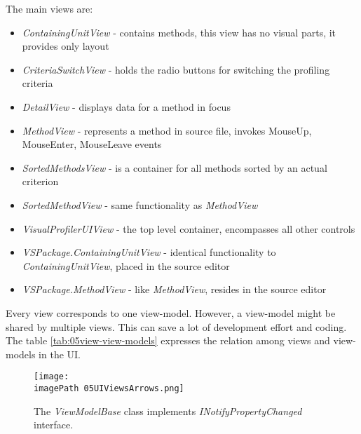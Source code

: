 The main views are:

\begin{itemize}	
\item  \textit{ContainingUnitView} - contains methods, this view has no visual parts, it provides only layout 

\item \textit{CriteriaSwitchView} - holds the radio buttons for switching the profiling criteria

\item \textit{DetailView} - displays data for a method in focus

\item \textit{MethodView} - represents a method in source file, invokes MouseUp, MouseEnter, MouseLeave events

\item \textit{SortedMethodsView} - is a container for all methods sorted by an actual criterion

\item \textit{SortedMethodView} - same functionality as \textit{MethodView}

\item \textit{VisualProfilerUIView} - the top level container, encompasses all other controls

\item \textit{VSPackage.ContainingUnitView} - identical functionality to \textit{ContainingUnitView}, placed in the source editor 

\item \textit{VSPackage.MethodView} - like \textit{MethodView}, resides in the source editor

\end{itemize}

Every view corresponds to one view-model. However, a view-model might be shared by multiple views. This can save a lot of development effort and coding. The table \ref{tab:05view-view-models} expresses the relation among views and view-models in the UI.

\begin{figure}
	\centering
		\texttt{[image: \\imagePath 05UIViewsArrows.png]}
		\caption{The \textit{ViewModelBase} class implements \textit{INotifyPropertyChanged} interface.}
	\label{fig:05UIViewsArrows}
\end{figure}

